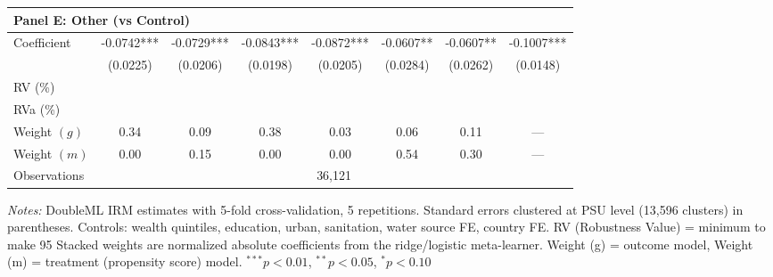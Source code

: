 \begin{table}[htbp]
\begin{tabular}{lccccccc}
\multicolumn{8}{l}{\textbf{Panel E: Other (vs Control)}} \\
\midrule
Coefficient & -0.0742*** & -0.0729*** & -0.0843*** & -0.0872*** & -0.0607** & -0.0607** & -0.1007*** \\
 & (0.0225) & (0.0206) & (0.0198) & (0.0205) & (0.0284) & (0.0262) & (0.0148) \\
RV (\%) \\
RVa (\%) \\
Weight $(g)$ & 0.34 & 0.09 & 0.38 & 0.03 & 0.06 & 0.11 & — \\
Weight $(m)$ & 0.00 & 0.15 & 0.00 & 0.00 & 0.54 & 0.30 & — \\

\midrule
Observations & \multicolumn{7}{c}{36,121} \\
\bottomrule
\end{tabular}
\begin{minipage}{\textwidth}
\footnotesize
\textit{Notes:} DoubleML IRM estimates with 5-fold cross-validation, 5 repetitions. 
Standard errors clustered at PSU level (13,596 clusters) in parentheses. 
Controls: wealth quintiles, education, urban, sanitation, water source FE, country FE. 
RV (Robustness Value) = minimum %
to make 95%
Stacked weights are normalized absolute coefficients from the ridge/logistic meta-learner. 
Weight (g) = outcome model, Weight (m) = treatment (propensity score) model. 
$^{***}p<0.01$, $^{**}p<0.05$, $^{*}p<0.10$
\end{minipage}
\end{table}